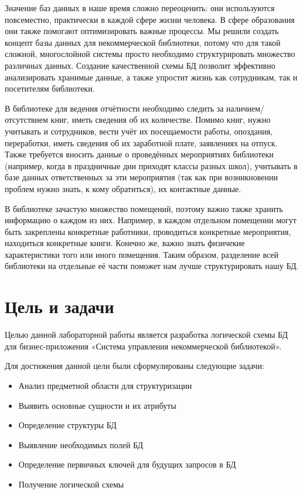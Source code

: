 \documentclass[14pt]{extreport}
\begin{document}
\pagestyle{empty} %


\pagestyle{plain} %
\tableofcontents

\intro

Значение баз данных в наше время сложно переоценить: они используются повсеместно, практически в каждой сфере жизни человека. В сфере образования они также помогают оптимизировать важные процессы. Мы решили создать концепт базы данных для некоммерческой библиотеки, потому что для такой сложной, многослойной системы просто необходимо структурировать множество различных данных. Создание качественной схемы БД позволит эффективно анализировать хранимые данные, а также упростит жизнь как сотрудникам, так и посетителям библиотеки. 

В библиотеке для ведения отчётности необходимо следить за наличием/отсутствием книг, иметь сведения об их количестве. Помимо книг, нужно учитывать и сотрудников, вести учёт их посещаемости работы, опоздания, переработки, иметь сведения об их заработной плате, заявлениях на отпуск. Также требуется вносить данные о проведённых мероприятиях библиотеки (например, когда в праздничные дни приходят классы разных школ), учитывать в базе данных ответственных за эти мероприятия (так как при возникновении проблем нужно знать, к кому обратиться), их контактные данные.

В библиотеке зачастую множество помещений, поэтому важно также хранить информацию о каждом из них. Например, в каждом отдельном помещении могут быть закреплены конкретные работники, проводиться конкретные мероприятия, находиться конкретные книги. Конечно же, важно знать физичекие характеристики того или иного помещения. Таким образом, разделение всей библиотеки на отдельные её части поможет нам лучше структурировать нашу БД.


\chapter{Цель и задачи}

Целью данной лабораторной работы является разработка логической схемы БД для бизнес-приложения «Система управления некоммерческой библиотекой».

Для достижения данной цели были сформулированы следующие задачи:
\begin{itemize}
    \item Анализ предметной области для структуризации
    \item Выявить основные сущности и их атрибуты
    \item Определение структуры БД
    \item Выявление необходимых полей БД
    \item Определение первичных ключей для будущих запросов в БД
    \item Получение логической схемы
\end{itemize}
\end{document}
